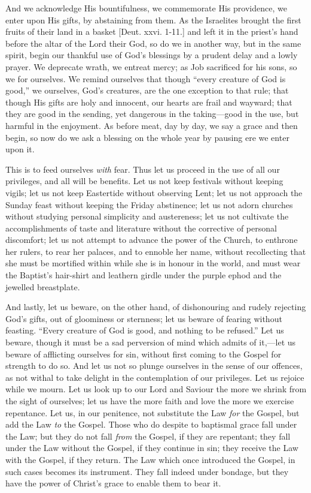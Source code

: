 And we acknowledge His bountifulness, we commemorate His
providence, we enter upon His gifts, by abstaining from them. As the
Israelites brought the first fruits of their land in a basket [Deut.
xxvi. 1-11.] and left it in the priest's hand before the altar of the
Lord their God, so do we in another way, but in the same spirit, begin
our thankful use of God's blessings by a prudent delay and a lowly
prayer. We deprecate wrath, we entreat mercy; as Job sacrificed for
his sons, so we for ourselves. We remind ourselves that though
``every creature of God is good,'' we ourselves, God's
creatures, are the one exception to that rule; that though His gifts
are holy and innocent, our hearts are frail and wayward; that they are
good in the sending, yet dangerous in the taking—good in the use,
but harmful in the enjoyment. As before meat, day by day, we say a
grace and then begin, so now do we ask a blessing on the whole year by
pausing ere we enter upon it.

This is to feed ourselves \emph{with} fear. Thus let us proceed in
the use of all our privileges, and all will be benefits. Let us not
keep festivals without keeping vigils; let us not keep Eastertide
without observing Lent; let us not approach the Sunday feast without
keeping the Friday abstinence; let us not adorn churches without
studying personal simplicity and austereness; let us not cultivate the
accomplishments of taste and literature without the corrective of
personal discomfort; let us not attempt to advance the power of the
Church, to enthrone her rulers, to rear her palaces, and to ennoble
her name, without recollecting that she must be mortified within while
she is in honour in the world, and must wear the Baptist's hair-shirt
and leathern girdle under the purple ephod and the jewelled
breastplate.

And lastly, let us beware, on the other hand, of dishonouring and
rudely rejecting God's gifts, out of gloominess or sternness; let us
beware of fearing without feasting. ``Every creature of God is
good, and nothing to be refused.'' Let us beware, though it must
be a sad perversion of mind which admits of it,—let us beware of
afflicting ourselves for sin, without first coming to the Gospel for
strength to do so. And let us not so plunge ourselves in the sense of
our offences, as not withal to take delight in the contemplation of
our privileges. Let us rejoice while we mourn. Let us look up to our
Lord and Saviour the more we shrink from the sight of ourselves; let
us have the more faith and love the more we exercise repentance. Let
us, in our penitence, not substitute the Law \emph{for} the Gospel,
but add the Law \emph{to} the Gospel. Those who do despite to
baptismal grace fall under the Law; but they do not fall \emph{from}
the Gospel, if they are repentant; they fall under the Law without the
Gospel, if they continue in sin; they receive the Law with the Gospel,
if they return. The Law which once introduced the Gospel, in such
cases becomes its instrument. They fall indeed under bondage, but they
have the power of Christ's grace to enable them to bear it.

